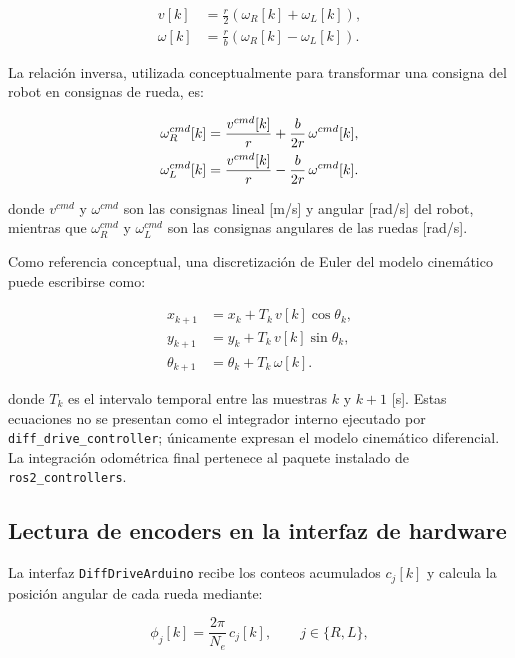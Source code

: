 \begin{align}
v[k] &= \frac{r}{2}\left(\omega_R[k]+\omega_L[k]\right),
\label{eq:v_lineal}\\
\omega[k] &= \frac{r}{b}\left(\omega_R[k]-\omega_L[k]\right).
\label{eq:v_angular}
\end{align}

La relación inversa, utilizada conceptualmente para transformar una consigna del robot en consignas de rueda, es:

\begin{align}
\omega_R^{cmd}[k]
&=
\frac{v^{cmd}[k]}{r}
+
\frac{b}{2r}\,\omega^{cmd}[k],
\notag\\
\omega_L^{cmd}[k]
&=
\frac{v^{cmd}[k]}{r}
-
\frac{b}{2r}\,\omega^{cmd}[k].
\label{eq:cinematica_inversa}
\end{align}

\noindent donde $v^{cmd}$ y $\omega^{cmd}$ son las consignas lineal [m/s] y angular [rad/s] del robot, mientras que $\omega_R^{cmd}$ y $\omega_L^{cmd}$ son las consignas angulares de las ruedas [rad/s].

Como referencia conceptual, una discretización de Euler del modelo cinemático puede escribirse como:

\begin{align}
x_{k+1} &= x_k + T_k\,v[k]\cos\theta_k,
\label{eq:pose_x}\\
y_{k+1} &= y_k + T_k\,v[k]\sin\theta_k,
\label{eq:pose_y}\\
\theta_{k+1} &= \theta_k + T_k\,\omega[k].
\label{eq:pose_theta}
\end{align}

\noindent donde $T_k$ es el intervalo temporal entre las muestras $k$ y $k+1$ [s]. Estas ecuaciones no se presentan como el integrador interno ejecutado por \texttt{diff\_drive\_controller}; únicamente expresan el modelo cinemático diferencial. La integración odométrica final pertenece al paquete instalado de \texttt{ros2\_controllers}.

\subsection{Lectura de encoders en la interfaz de hardware}

La interfaz \texttt{DiffDriveArduino} recibe los conteos acumulados $c_j[k]$ y calcula la posición angular de cada rueda mediante:

\begin{equation}
\phi_j[k]
=
\frac{2\pi}{N_e}\,c_j[k],
\qquad j\in\{R,L\},
\label{eq:posicion_rueda_encoder}
\end{equation}

